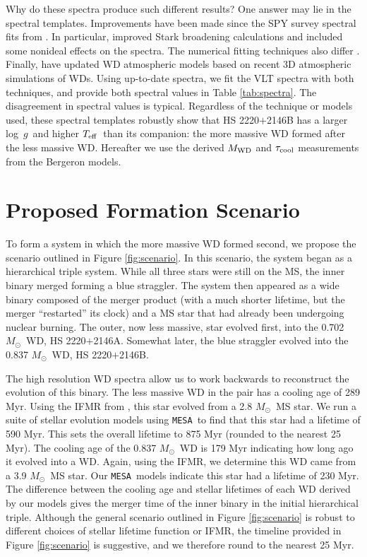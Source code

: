 \documentclass{emulateapj}
\newcommand{\Msun}{\ifmmode {M_{\odot}}\else${M_{\odot}}$\fi}
\newcommand{\Teff}{\ifmmode {T_{\rm eff} }\else $T_{\rm eff}$\fi}
\newcommand{\logg}{\ifmmode {{\rm log}\ g }\else log~$g$\fi}
\def\mesa{{\tt MESA}}
\begin{document}
Why do these spectra produce such different results? One answer may lie in the spectral templates. Improvements have been made since the SPY survey spectral fits from \citet{koester09}. In particular, \citet{tremblay09} improved Stark broadening calculations and included some nonideal effects on the spectra. The numerical fitting techniques also differ \citep[see][for a discussion of these differences]{gianninas11}. Finally, \citet{tremblay13} have updated WD atmospheric models based on recent 3D atmospheric simulations of WDs. Using up-to-date spectra, we fit the VLT spectra with both techniques, and provide both spectral values in Table \ref{tab:spectra}. The disagreement in spectral values is typical. Regardless of the technique or models used, these spectral templates robustly show that HS 2220$+$2146B has a larger \logg\ and higher \Teff\ than its companion: the more massive WD formed after the less massive WD. Hereafter we use the derived $M_{\rm WD}$ and $\tau_{\rm cool}$ measurements from the Bergeron models.




\section{Proposed Formation Scenario} \label{sec:scenario}

To form a system in which the more massive WD formed second, we propose the scenario outlined in Figure \ref{fig:scenario}. In this scenario, the system began as a hierarchical triple system. While all three stars were still on the MS, the inner binary merged forming a blue straggler. The system then appeared as a wide binary composed of the merger product (with a much shorter lifetime, but the merger ``restarted'' its clock) and a MS star that had already been undergoing nuclear burning. The outer, now less massive, star evolved first, into the 0.702 \Msun\ WD, HS 2220$+$2146A. Somewhat later, the blue straggler evolved into the 0.837 \Msun\ WD, HS 2220$+$2146B.


The high resolution WD spectra allow us to work backwards to reconstruct the evolution of this binary. The less massive WD in the pair has a cooling age of 289 Myr. Using the IFMR from \citet{williams09}, this star evolved from a  2.8 \Msun\ MS star. We run a suite of stellar evolution models using \mesa\ to find that this star had a lifetime of 590 Myr. This sets the overall lifetime to 875 Myr (rounded to the nearest 25 Myr). The cooling age of the 0.837 \Msun\ WD is 179 Myr indicating how long ago it evolved into a WD. Again, using the \citet{williams09} IFMR, we determine this WD came from a 3.9 \Msun\ MS star. Our \mesa\ models indicate this star had a lifetime of 230 Myr. The difference between the cooling age and stellar lifetimes of each WD derived by our models gives the merger time of the inner binary in the initial hierarchical triple. Although the general scenario outlined in Figure \ref{fig:scenario} is robust to different choices of stellar lifetime function or IFMR, the timeline provided in Figure \ref{fig:scenario} is suggestive, and we therefore round to the nearest 25 Myr.
\end{document}
